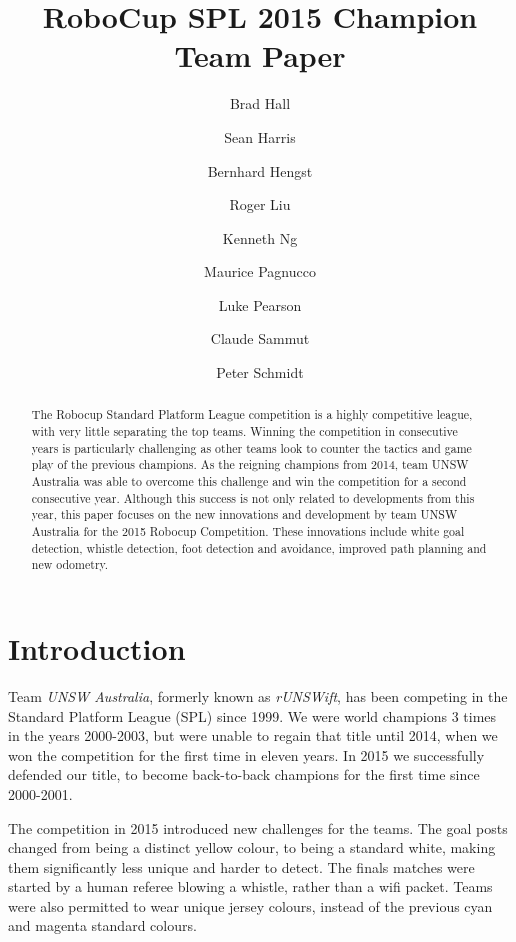 \documentclass[runningheads,a4paper]{llncs}
\begin{document}
\mainmatter 

\title{RoboCup SPL 2015 Champion Team Paper}

\author{
Brad Hall
\and Sean Harris
\and Bernhard Hengst
\and Roger Liu
\and Kenneth Ng
\and Maurice Pagnucco
\and Luke Pearson
\and Claude Sammut
\and Peter Schmidt
}


\maketitle

\begin{abstract}
The Robocup Standard Platform League competition is a highly competitive league, with very little separating the top teams. Winning the competition in consecutive years is particularly challenging as other teams look to counter the tactics and game play of the previous champions. As the reigning champions from 2014, team UNSW Australia was able to overcome this challenge and win the competition for a second consecutive year. Although this success is not only related to developments from this year, this paper focuses on the new innovations and development by team UNSW Australia for the 2015 Robocup Competition. These innovations include white goal detection, whistle detection, foot detection and avoidance, improved path planning and new odometry.
\end{abstract}





\section{Introduction}
Team \emph{UNSW Australia}, formerly known as \emph{rUNSWift}, has been competing in the Standard Platform League (SPL) since 1999. We were world champions 3 times in the years 2000-2003, but were unable to regain that title until 2014, when we won the competition for the first time in eleven years. In 2015 we successfully defended our title, to become back-to-back champions for the first time since 2000-2001.

The competition in 2015 introduced new challenges for the teams. The goal posts changed from being a distinct yellow colour, to being a standard white, making them significantly less unique and harder to detect. The finals matches were started by a human referee blowing a whistle, rather than a wifi packet. Teams were also permitted to wear unique jersey colours, instead of the previous cyan and magenta standard colours.
\end{document}
